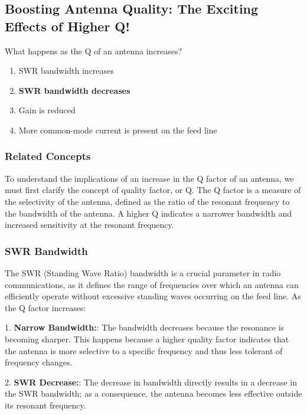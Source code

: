 \subsection{Boosting Antenna Quality: The Exciting Effects of Higher Q!}

\begin{tcolorbox}[colback=gray!10, colframe=black, title=E9D08] What happens as the Q of an antenna increases?
\begin{enumerate}[label=\Alph*.]
    \item SWR bandwidth increases
    \item \textbf{SWR bandwidth decreases}
    \item Gain is reduced
    \item More common-mode current is present on the feed line
\end{enumerate} \end{tcolorbox}

\subsubsection{Related Concepts}

To understand the implications of an increase in the Q factor of an antenna, we must first clarify the concept of quality factor, or Q. The Q factor is a measure of the selectivity of the antenna, defined as the ratio of the resonant frequency to the bandwidth of the antenna. A higher Q indicates a narrower bandwidth and increased sensitivity at the resonant frequency.

\subsubsection{SWR Bandwidth}

The SWR (Standing Wave Ratio) bandwidth is a crucial parameter in radio communications, as it defines the range of frequencies over which an antenna can efficiently operate without excessive standing waves occurring on the feed line. As the Q factor increases:

1. \textbf{Narrow Bandwidth:}: The bandwidth decreases because the resonance is becoming sharper. This happens because a higher quality factor indicates that the antenna is more selective to a specific frequency and thus less tolerant of frequency changes.

2. \textbf{SWR Decrease:}: The decrease in bandwidth directly results in a decrease in the SWR bandwidth; as a consequence, the antenna becomes less effective outside its resonant frequency.

